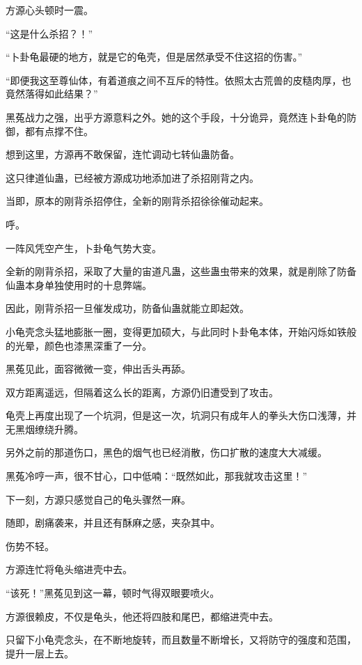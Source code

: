 
\begin{this_body}

方源心头顿时一震。

“这是什么杀招？！”

“卜卦龟最硬的地方，就是它的龟壳，但是居然承受不住这招的伤害。”

“即便我这至尊仙体，有着道痕之间不互斥的特性。依照太古荒兽的皮糙肉厚，也竟然落得如此结果？”

黑菟战力之强，出乎方源意料之外。她的这个手段，十分诡异，竟然连卜卦龟的防御，都有点撑不住。

想到这里，方源再不敢保留，连忙调动七转仙蛊防备。

这只律道仙蛊，已经被方源成功地添加进了杀招刚背之内。

当即，原本的刚背杀招停住，全新的刚背杀招徐徐催动起来。

呼。

一阵风凭空产生，卜卦龟气势大变。

全新的刚背杀招，采取了大量的宙道凡蛊，这些蛊虫带来的效果，就是削除了防备仙蛊本身单独使用时的十息弊端。

因此，刚背杀招一旦催发成功，防备仙蛊就能立即起效。

小龟壳念头猛地膨胀一圈，变得更加硕大，与此同时卜卦龟本体，开始闪烁如铁般的光晕，颜色也漆黑深重了一分。

黑菟见此，面容微微一变，伸出舌头再舔。

双方距离遥远，但隔着这么长的距离，方源仍旧遭受到了攻击。

龟壳上再度出现了一个坑洞，但是这一次，坑洞只有成年人的拳头大伤口浅薄，并无黑烟缭绕升腾。

另外之前的那道伤口，黑色的烟气也已经消散，伤口扩散的速度大大减缓。

黑菟冷哼一声，很不甘心，口中低喃：“既然如此，那我就攻击这里！”

下一刻，方源只感觉自己的龟头骤然一麻。

随即，剧痛袭来，并且还有酥麻之感，夹杂其中。

伤势不轻。

方源连忙将龟头缩进壳中去。

“该死！”黑菟见到这一幕，顿时气得双眼要喷火。

方源很赖皮，不仅是龟头，他还将四肢和尾巴，都缩进壳中去。

只留下小龟壳念头，在不断地旋转，而且数量不断增长，又将防守的强度和范围，提升一层上去。


\end{this_body}
